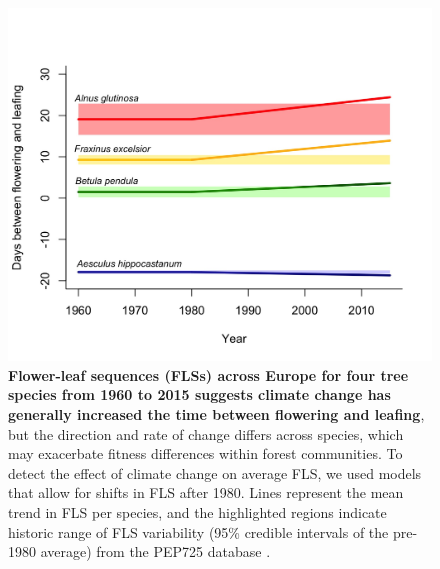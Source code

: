 \documentclass[12pt]{article}
\begin{document}
\begin{figure}[h!]
    \centering
 \includegraphics[width=\textwidth]{..//PEP725/FLS_climate_change.jpeg} 
    \caption{\textbf{Flower-leaf sequences (FLSs) across Europe for four tree species from 1960 to 2015 suggests climate change has generally increased the time between flowering and leafing}, but the direction and rate of change differs across species, which may exacerbate fitness differences within forest communities. To detect the effect of climate change on average FLS, we used models that allow for shifts in FLS after 1980. Lines represent the mean trend in FLS per species, and the highlighted regions indicate historic range of FLS variability (95\% credible intervals of the pre-1980 average) from the PEP725 database \citep{PEP725}.}
    \label{fig:climchange}
\end{figure}
 
\end{document}
